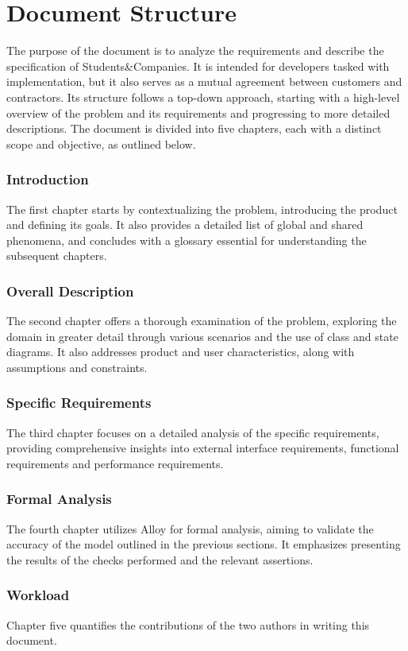 \section{Document Structure}
The purpose of the document is to analyze the requirements and describe the specification of Students\&Companies.
It is intended for developers tasked with implementation, but it also serves as a mutual agreement between customers and contractors.
Its structure follows a top-down approach, starting with a high-level overview of the problem and its requirements and progressing to more detailed descriptions.
The document is divided into five chapters, each with a distinct scope and objective, as outlined below.

\subsubsection{Introduction}
The first chapter starts by contextualizing the problem, introducing the product and defining its goals.
It also provides a detailed list of global and shared phenomena, and concludes with a glossary essential for understanding the subsequent chapters.

\subsubsection{Overall Description}
The second chapter offers a thorough examination of the problem, exploring the domain in greater detail through various scenarios and the use of class and state diagrams.
It also addresses product and user characteristics, along with assumptions and constraints.

\subsubsection{Specific Requirements}
The third chapter focuses on a detailed analysis of the specific requirements, providing comprehensive insights into external interface requirements, functional requirements and performance requirements.

\subsubsection{Formal Analysis}
The fourth chapter utilizes Alloy for formal analysis, aiming to validate the accuracy of the model outlined in the previous sections.
It emphasizes presenting the results of the checks performed and the relevant assertions.

\subsubsection{Workload}
Chapter five quantifies the contributions of the two authors in writing this document.
